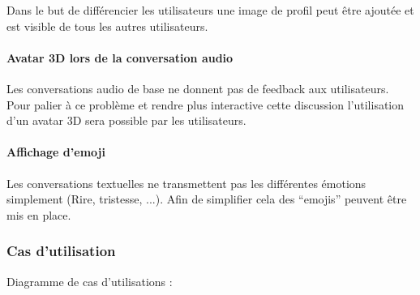 \par Dans le but de différencier les utilisateurs une image de profil peut être ajoutée et est visible de tous les autres utilisateurs.

\paragraph{Avatar 3D lors de la conversation audio\newline}

\par Les conversations audio de base ne donnent pas de feedback aux utilisateurs. Pour palier à ce problème et rendre plus interactive cette discussion l’utilisation d’un avatar 3D sera possible par les utilisateurs.

\paragraph{Affichage d’emoji\newline}

\par Les conversations textuelles ne transmettent pas les différentes émotions simplement (Rire, tristesse, ...). Afin de simplifier cela des “emojis” peuvent être mis en place.

\newpage
\subsubsection{Cas d’utilisation}

Diagramme de cas d'utilisations : \newline


